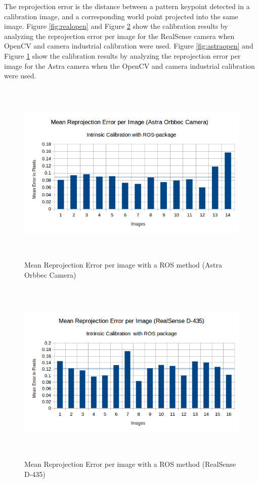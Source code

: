 The reprojection error is the distance between a pattern keypoint detected in a calibration image, and a corresponding world point projected into the same image. Figure \ref{fig:realopen} and Figure \ref{fig:realros} show the calibration results by analyzing the reprojection error per image for the RealSense camera when OpenCV and camera \textunderscore industrial calibration were used. Figure \ref{fig:astraopen} and Figure \ref{fig:astraros} show the calibration results by analyzing the reprojection error per image for the Astra camera when the OpenCV and camera \textunderscore industrial calibration were used.
\begin{figure}[!h]
\begin{center}
\includegraphics[width=5in, height=3.5in]{figures05/ros_int_cal_astra.png}
\caption{Mean Reprojection Error per image with a ROS method (Astra Orbbec Camera)}%
\label{fig:astraros}
\end{center}
\end{figure}

\begin{figure}[!h]
\begin{center}
\includegraphics[width=5in, height=3.5in]{figures05/ros_int_cal_real.png}
\caption{Mean Reprojection Error per image with a ROS method (RealSense D-435)}%
\label{fig:realros}
\end{center}
\end{figure}

